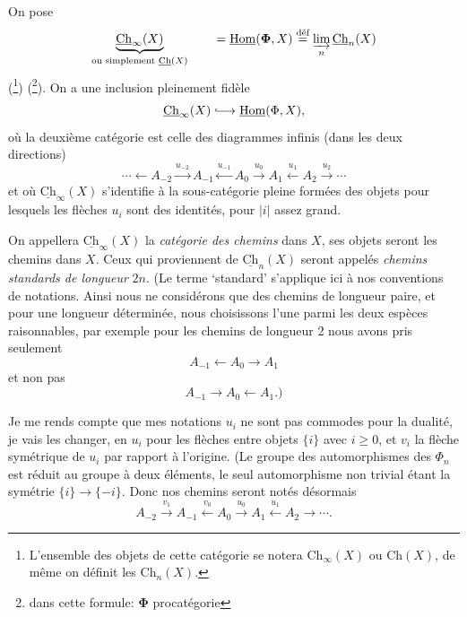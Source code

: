 \documentclass[11pt]{article}
\newcommand{\msp}[1]{\marginpar{\footnotesize [#1]}}
\newcommand{\uCh}{\underline{\mathrm{Ch}}}
\newcommand{\uHom}{\underline{\mathrm{Hom}}}
\newcommand{\bPhi}{\boldsymbol{\Phi}}
\begin{document}
\msp{page 3}
On pose
\[
\underbrace{\uCh_\infty(X)}_{\text{ou simplement }\uCh(X)}\qquad=\uHom(\bPhi,X)\overset{\text{déf}}{=}\varinjlim_n\uCh_n(X)
\]
(\footnote{L'ensemble des objets de cette catégorie se notera $\mathrm{Ch}_\infty(X)$ ou $\mathrm{Ch}(X)$, de même on définit les $\mathrm{Ch}_n(X)$.}) (\footnote{dans cette formule: $\bPhi$ procatégorie}). On a une inclusion pleinement fidèle
\[
\uCh_\infty(X)\lhook\joinrel\longrightarrow\uHom(\Phi,X),
\]
où la deuxième catégorie est celle des diagrammes infinis (dans les deux directions)
\[
\cdots\longleftarrow A_{-2}\xrightarrow{u_{-2}}A_{-1}\xleftarrow{u_{-1}}A_0\xrightarrow{u_0}A_1\xleftarrow{u_1}A_2\xrightarrow{u_2}\cdots
\]
et où $\uCh_\infty(X)$ s'identifie à la sous-catégorie pleine formées des objets pour lesquels les flèches $u_i$ sont des identités, pour $|i|$ assez grand. %

On appellera $\uCh_\infty(X)$ la \textit{catégorie des chemins} dans $X$, ses objets seront les chemins dans $X$. Ceux qui proviennent de $\uCh_n(X)$ seront appelés \textit{chemins standards de longueur} $2n$. (Le terme `standard' s'applique ici à nos conventions de notations. Ainsi nous ne considérons que des chemins de longueur paire, et pour une longueur déterminée, nous choisissons l'une parmi les deux espèces raisonnables, par exemple pour les chemins de longueur 2 nous avons pris seulement
\[
A_{-1}\longleftarrow A_0\longrightarrow A_1
\]
et non pas
\[
A_{-1}\longrightarrow A_0\longleftarrow A_1.)
\]

\msp{page 4}
Je me rends compte que mes notations $u_i$ ne sont pas commodes pour la dualité, je vais les changer, en $u_i$ pour les flèches entre objets $\{i\}$ avec $i\ge0$, et $v_i$ la flèche symétrique de $u_i$ par rapport à l'origine. (Le groupe des automorphismes des $\Phi_n$ est réduit au groupe à deux éléments, le seul automorphisme non trivial étant la symétrie $\{i\}\longrightarrow\{-i\}$. Donc nos chemins seront notés désormais %
\[
A_{-2}\xrightarrow{v_1}A_{-1}\xleftarrow{v_0}A_0\xrightarrow{u_0}A_1\xleftarrow{u_1}A_2\longrightarrow\cdots.
\tag*{$(*)$}
\]
\end{document}
